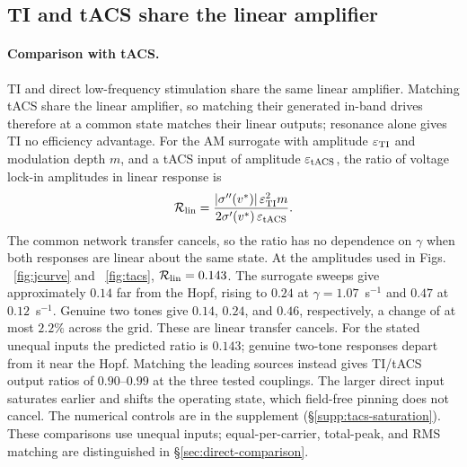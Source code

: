 \documentclass[11pt,a4paper]{article}
\newif\ifjne
\newcommand{\Sig}{\sigma}
\providecommand{\DIFaddtex}[1]{{\protect\color{blue} \sf #1}} %
\providecommand{\DIFdeltex}[1]{{\protect\color{red} \scriptsize #1}} %
\providecommand{\DIFaddbegin}{} %
\providecommand{\DIFaddend}{} %
\providecommand{\DIFdelbegin}{} %
\providecommand{\DIFdelend}{} %
\providecommand{\DIFadd}[1]{\texorpdfstring{\DIFaddtex{#1}}{#1}} %
\providecommand{\DIFdel}[1]{\texorpdfstring{\DIFdeltex{#1}}{}} %
\begin{document}
\DIFdelbegin \subsection{\DIFdel{TI and tACS share the linear amplifier}}%
\addtocounter{subsection}{-1}%
\DIFdelend \DIFaddbegin \paragraph{\DIFadd{Comparison with tACS.}}\DIFaddend \label{sec:tacs-results}
TI and \DIFdelbegin \DIFdel{direct low-frequency stimulation share the same linear amplifier.
Matching }\DIFdelend \DIFaddbegin \DIFadd{tACS share the linear amplifier, so matching }\DIFaddend their generated in-band
drives \DIFdelbegin \DIFdel{therefore }\DIFdelend \DIFaddbegin \DIFadd{at a common state }\DIFaddend matches their linear outputs; resonance alone gives
TI no efficiency advantage.
For the AM surrogate with amplitude $\varepsilon_{\rm TI}$ and modulation depth
$m$, and a tACS input of amplitude $\varepsilon_{\rm tACS}$, the ratio of voltage
lock-in amplitudes in linear response is
\[
\mathcal R_{\rm lin}
=\frac{|\Sig''(v^*)|\,\varepsilon_{\rm TI}^2m}{2\Sig'(v^*)\,\varepsilon_{\rm tACS}}.
\]
The common \DIFdelbegin \DIFdel{network transfer cancels, so the ratio has no dependence on $\gamma$
when both responses are linear about the same state. At the
amplitudes used in
Figs. ~\ref{fig:jcurve} and ~\ref{fig:tacs}, $\mathcal R_{\rm lin}=0.143$.
The surrogate sweeps give approximately $0.14$ far from the Hopf, rising to $0.24$
at $\gamma=1.07$~s$^{-1}$ and $0.47$ at $0.12$~s$^{-1}$. Genuine two tones give
$0.14$, $0.24$, and $0.46$, respectively, a change of at most $2.2\%$ across the grid.
These are }\DIFdelend \DIFaddbegin \DIFadd{linear transfer cancels. For the stated unequal inputs the predicted ratio is $0.143$;
genuine two-tone responses depart from it near the Hopf. Matching the
leading sources instead gives TI/tACS output ratios of $0.90$--$0.99$
at the three tested couplings. The larger direct input saturates earlier
and shifts the operating state, which field-free pinning does not cancel.
The numerical controls are in the supplement
(\S\ref{supp:tacs-saturation}). These comparisons use unequal inputs;
equal-per-carrier, total-peak, and RMS matching are distinguished in
\S\ref{sec:direct-comparison}.
}

\ifjne\else
\end{document}
